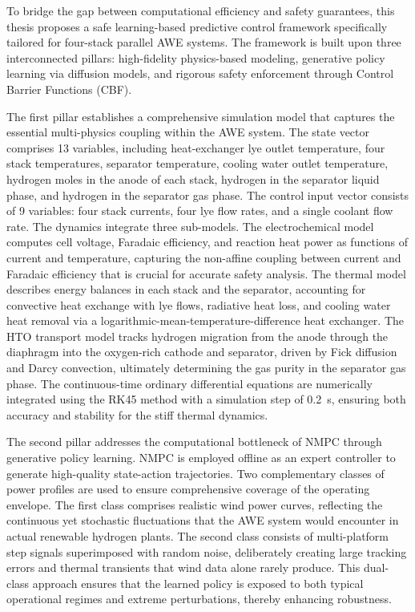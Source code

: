 \begin{digest}[en]
To bridge the gap between computational efficiency and safety guarantees, this thesis proposes a safe learning-based predictive control framework specifically tailored for four-stack parallel AWE systems. The framework is built upon three interconnected pillars: high-fidelity physics-based modeling, generative policy learning via diffusion models, and rigorous safety enforcement through Control Barrier Functions (CBF).

The first pillar establishes a comprehensive simulation model that captures the essential multi-physics coupling within the AWE system. The state vector comprises 13 variables, including heat-exchanger lye outlet temperature, four stack temperatures, separator temperature, cooling water outlet temperature, hydrogen moles in the anode of each stack, hydrogen in the separator liquid phase, and hydrogen in the separator gas phase. The control input vector consists of 9 variables: four stack currents, four lye flow rates, and a single coolant flow rate. The dynamics integrate three sub-models. The electrochemical model computes cell voltage, Faradaic efficiency, and reaction heat power as functions of current and temperature, capturing the non-affine coupling between current and Faradaic efficiency that is crucial for accurate safety analysis. The thermal model describes energy balances in each stack and the separator, accounting for convective heat exchange with lye flows, radiative heat loss, and cooling water heat removal via a logarithmic-mean-temperature-difference heat exchanger. The HTO transport model tracks hydrogen migration from the anode through the diaphragm into the oxygen-rich cathode and separator, driven by Fick diffusion and Darcy convection, ultimately determining the gas purity in the separator gas phase. The continuous-time ordinary differential equations are numerically integrated using the RK45 method with a simulation step of 0.2~s, ensuring both accuracy and stability for the stiff thermal dynamics.

The second pillar addresses the computational bottleneck of NMPC through generative policy learning. NMPC is employed offline as an expert controller to generate high-quality state-action trajectories. Two complementary classes of power profiles are used to ensure comprehensive coverage of the operating envelope. The first class comprises realistic wind power curves, reflecting the continuous yet stochastic fluctuations that the AWE system would encounter in actual renewable hydrogen plants. The second class consists of multi-platform step signals superimposed with random noise, deliberately creating large tracking errors and thermal transients that wind data alone rarely produce. This dual-class approach ensures that the learned policy is exposed to both typical operational regimes and extreme perturbations, thereby enhancing robustness.


\end{digest}
